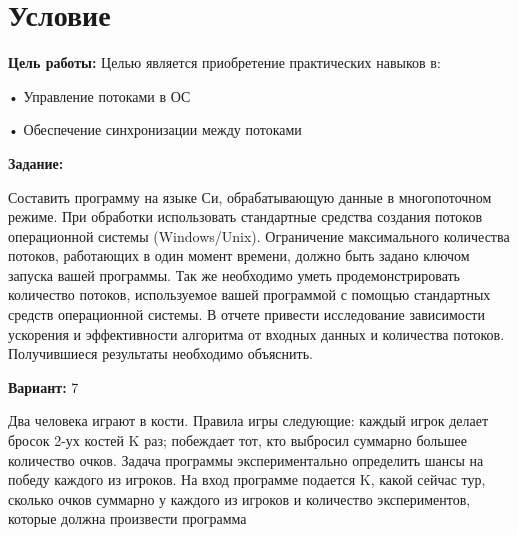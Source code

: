 \section{Условие}

{\bfseries Цель работы:}
Целью является приобретение практических навыков в:

    • Управление потоками в ОС 

    • Обеспечение синхронизации между потоками
    
{\bfseries Задание:}

Составить программу на языке Си, обрабатывающую данные в многопоточном режиме. При обработки использовать стандартные средства создания потоков операционной системы (Windows/Unix). Ограничение максимального количества потоков, работающих в один момент времени, должно быть задано ключом запуска вашей программы.
Так же необходимо уметь продемонстрировать количество потоков, используемое вашей программой с помощью стандартных средств операционной системы.
В отчете привести исследование зависимости ускорения и эффективности алгоритма от входных данных и количества потоков. Получившиеся результаты необходимо объяснить.

{\bfseries Вариант:} 7

Два человека играют в кости. Правила игры следующие: каждый игрок делает бросок 2-ух костей K раз; побеждает тот, кто выбросил суммарно большее количество очков.  Задача программы экспериментально определить шансы на победу каждого из игроков. На вход программе подается K, какой сейчас тур, сколько очков суммарно у каждого из игроков и количество экспериментов, которые должна произвести программа

